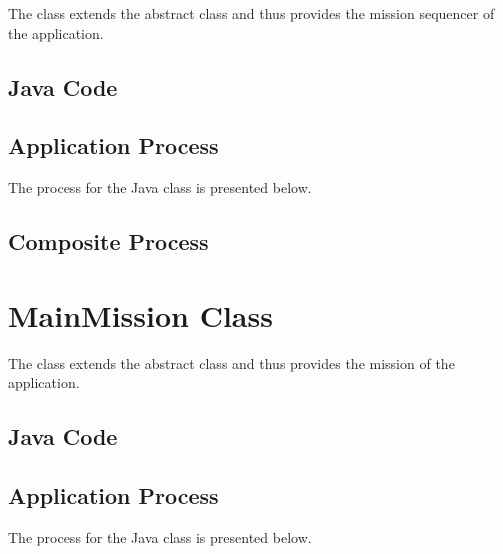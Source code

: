 \documentclass{article}
\begin{document}
The  class extends the abstract  class and thus provides the mission sequencer of the application.

\subsection{Java Code}


\subsection{Application Process}

The process for the  Java class is presented below.

\begin{circusbox}

\end{circusbox}

\subsection{Composite Process}

\begin{circusbox}

\end{circusbox}


\section{MainMission Class}

The  class extends the abstract  class and thus provides the mission of the application.

\subsection{Java Code}


\subsection{Application Process}

The process for the  Java class is presented below.
\end{document}
